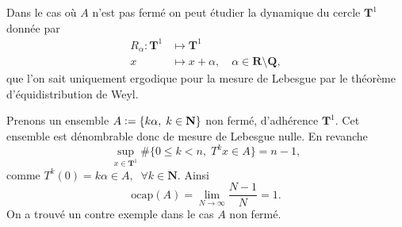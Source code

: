 \documentclass[12pt]{article}
\newcommand{\defeq}{\vcentcolon=}
\newcommand{\R}{\mathbf{R}}
\newcommand{\N}{\mathbf{N}}
\newcommand{\Q}{\mathbf{Q}}
\begin{document}
\medskip

        Dans le cas où $A$ n'est pas fermé on peut étudier la dynamique du cercle $\mathbf{T}^{1}$ donnée par
        \begin{align*}
                R_{\alpha} : \mathbf{T}^{1} &\longmapsto \mathbf{T}^{1} \\ 
                        x &\longmapsto x + \alpha, \quad \alpha \in \R \setminus \Q
        ,\end{align*}
        que l'on sait uniquement ergodique pour la mesure de Lebesgue par le théorème d'équidistribution de Weyl.  

        Prenons un ensemble $A \defeq \{k\alpha, \; k\in \N\}$ non fermé, d'adhérence $\mathbf{T}^{1}$. Cet ensemble est dénombrable donc de mesure de Lebesgue nulle. En revanche \[
                \sup_{x\in \mathbf{T}^{1}}\#\{0\le k < n, \; T^{k}x \in A\} = n-1 
        ,\] comme $T^{k}(0) = k\alpha \in A, \; \; \forall k \in \N$. 
        Ainsi \[
                \mathrm{ocap}(A) = \lim_{N\to \infty}\frac{N-1}{N} = 1
        .\] On a trouvé un contre exemple dans le cas $A$ non fermé. 
\end{document}
